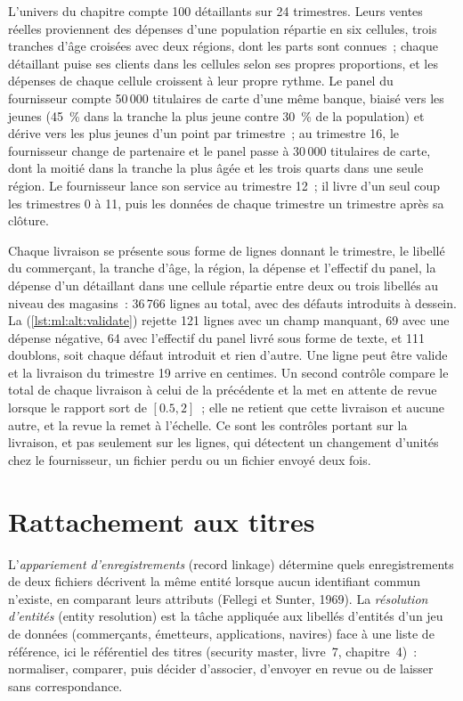 L'univers du chapitre compte 100 détaillants sur 24 trimestres. Leurs ventes réelles proviennent des dépenses d'une population répartie en six cellules,
trois tranches d'âge croisées avec deux régions, dont les parts sont connues~; chaque détaillant puise ses clients dans les cellules selon ses propres proportions,
et les dépenses de chaque cellule croissent à leur propre rythme. Le panel du fournisseur compte 50\,000 titulaires de carte d'une même banque, biaisé vers les jeunes
(45~\% dans la tranche la plus jeune contre 30~\% de la population) et dérive vers les plus jeunes d'un point par trimestre~; au trimestre 16, le
fournisseur change de partenaire et le panel passe à 30\,000 titulaires de carte, dont la moitié dans la tranche la plus âgée et les trois quarts dans une seule région.
Le fournisseur lance son service au trimestre 12~; il livre d'un seul coup les trimestres 0 à 11, puis les données de chaque trimestre un trimestre après sa clôture.

Chaque livraison se présente sous forme de lignes donnant le trimestre, le libellé du commerçant, la tranche d'âge, la région, la dépense et l'effectif du panel, la dépense d'un détaillant dans une cellule
répartie entre deux ou trois libellés au niveau des magasins~: 36\,766 lignes au total, avec des défauts introduits à dessein. La 
(\cref{lst:ml:alt:validate}) rejette 121 lignes avec un champ manquant, 69 avec une dépense négative, 64 avec l'effectif du panel livré
sous forme de texte, et 111 doublons, soit chaque défaut introduit et rien d'autre. Une ligne peut être valide et la
livraison du trimestre 19 arrive en centimes. Un second contrôle compare le total de chaque livraison à celui de la précédente et la
met en attente de revue lorsque le rapport sort de $[0.5, 2]$~; elle ne retient que cette livraison et aucune autre, et la revue la remet à l'échelle.
Ce sont les contrôles portant sur la livraison, et pas seulement sur les lignes, qui détectent un changement d'unités chez le fournisseur, un fichier perdu ou un fichier envoyé deux fois.

\section{Rattachement aux titres}

\begin{definition}\label{def:ml:alternative-data-pipelines:er}
L'\emph{appariement d'enregistrements} (record linkage) détermine quels enregistrements de deux fichiers décrivent la même entité lorsque
aucun identifiant commun n'existe, en comparant leurs attributs (Fellegi et Sunter, 1969).
La \emph{résolution d'entités} (entity resolution) est la tâche appliquée aux libellés d'entités d'un jeu de données (commerçants, émetteurs, applications, navires) face à une liste de référence,
ici le référentiel des titres (security master, livre~7, chapitre~4)~: normaliser, comparer, puis décider d'associer, d'envoyer en revue ou de laisser
sans correspondance.
\end{definition}

